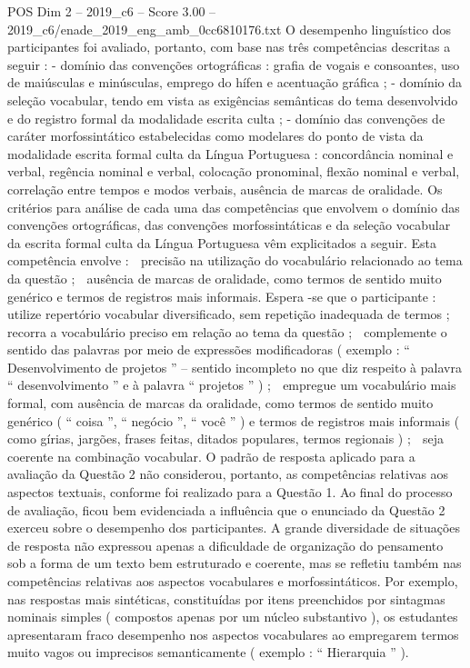 \begin{textsample}{POS Dim 2 – 2019\_c6 – Score 3.00 – 2019\_c6/enade\_2019\_eng\_amb\_0cc6810176.txt}
O desempenho linguístico dos participantes foi avaliado, portanto, com base nas três competências descritas a seguir : - domínio das convenções ortográficas : grafia de vogais e consoantes, uso de maiúsculas e minúsculas, emprego do hífen e acentuação gráfica ; - domínio da seleção vocabular, tendo em vista as exigências semânticas do tema desenvolvido e do registro formal da modalidade escrita culta ; - domínio das convenções de caráter morfossintático estabelecidas como modelares do ponto de vista da modalidade escrita formal culta da Língua Portuguesa : concordância nominal e verbal, regência nominal e verbal, colocação pronominal, flexão nominal e verbal, correlação entre tempos e modos verbais, ausência de marcas de oralidade.
Os critérios para análise de cada uma das competências que envolvem o domínio das convenções ortográficas, das convenções morfossintáticas e da seleção vocabular da escrita formal culta da Língua Portuguesa vêm explicitados a seguir.
Esta competência envolve :  precisão na utilização do vocabulário relacionado ao tema da questão ;  ausência de marcas de oralidade, como termos de sentido muito genérico e termos de registros mais informais.
Espera -se que o participante :  utilize repertório vocabular diversificado, sem repetição inadequada de termos ;  recorra a vocabulário preciso em relação ao tema da questão ;  complemente o sentido das palavras por meio de expressões modificadoras ( exemplo : “ Desenvolvimento de projetos ” – sentido incompleto no que diz respeito à palavra “ desenvolvimento ” e à palavra “ projetos ” ) ;  empregue um vocabulário mais formal, com ausência de marcas da oralidade, como termos de sentido muito genérico ( “ coisa ”, “ negócio ”, “ você ” ) e termos de registros mais informais ( como gírias, jargões, frases feitas, ditados populares, termos regionais ) ;  seja coerente na combinação vocabular.
O padrão de resposta aplicado para a avaliação da Questão 2 não considerou, portanto, as competências relativas aos aspectos textuais, conforme foi realizado para a Questão 1.
Ao final do processo de avaliação, ficou bem evidenciada a influência que o enunciado da Questão 2 exerceu sobre o desempenho dos participantes.
A grande diversidade de situações de resposta não expressou apenas a dificuldade de organização do pensamento sob a forma de um texto bem estruturado e coerente, mas se refletiu também nas competências relativas aos aspectos vocabulares e morfossintáticos.
Por exemplo, nas respostas mais sintéticas, constituídas por itens preenchidos por sintagmas nominais simples ( compostos apenas por um núcleo substantivo ), os estudantes apresentaram fraco desempenho nos aspectos vocabulares ao empregarem termos muito vagos ou imprecisos semanticamente ( exemplo : “ Hierarquia ” ).

\end{textsample}
